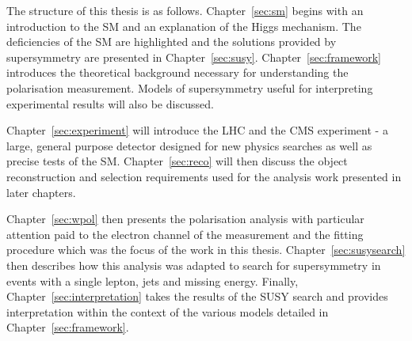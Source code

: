 The structure of this thesis is as follows. Chapter~\ref{sec:sm} begins with an
introduction to the \ac{SM} and an explanation of the Higgs mechanism. The
deficiencies of the \ac{SM} are highlighted and the solutions provided by
supersymmetry are presented in
Chapter~\ref{sec:susy}. Chapter~\ref{sec:framework} introduces the theoretical
background necessary for understanding the \PW polarisation measurement. Models
of supersymmetry useful for interpreting experimental results will also be
discussed.

Chapter~\ref{sec:experiment} will introduce the \ac{LHC} and the \ac{CMS}
experiment - a large, general purpose detector designed for new physics searches
as well as precise tests of the \ac{SM}. Chapter~\ref{sec:reco} will then
discuss the object reconstruction and selection requirements used for the
analysis work presented in later chapters.

Chapter~\ref{sec:wpol} then presents the \PW polarisation analysis with
particular attention paid to the electron channel of the measurement and the
fitting procedure which was the focus of the work in this
thesis. Chapter~\ref{sec:susysearch} then describes how this analysis was
adapted to search for supersymmetry in events with a single lepton, jets and
missing energy. Finally, Chapter~\ref{sec:interpretation} takes the results of
the \ac{SUSY} search and provides interpretation within the context of the
various models detailed in Chapter~\ref{sec:framework}.
